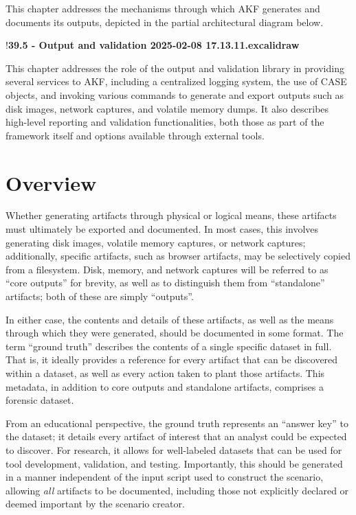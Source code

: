 This chapter addresses the mechanisms through which AKF generates and
documents its outputs, depicted in the partial architectural diagram
below.

!\textbf{39.5 - Output and validation 2025-02-08 17.13.11.excalidraw}

This chapter addresses the role of the output and validation library in
providing several services to AKF, including a centralized logging
system, the use of CASE objects, and invoking various commands to
generate and export outputs such as disk images, network captures, and
volatile memory dumps. It also describes high-level reporting and
validation functionalities, both those as part of the framework itself
and options available through external tools.

\section{Overview}\label{overview}

Whether generating artifacts through physical or logical means, these
artifacts must ultimately be exported and documented. In most cases,
this involves generating disk images, volatile memory captures, or
network captures; additionally, specific artifacts, such as browser
artifacts, may be selectively copied from a filesystem. Disk, memory,
and network captures will be referred to as ``core outputs'' for
brevity, as well as to distinguish them from ``standalone'' artifacts;
both of these are simply ``outputs''.

In either case, the contents and details of these artifacts, as well as
the means through which they were generated, should be documented in
some format. The term ``ground truth'' describes the contents of a
single specific dataset in full. That is, it ideally provides a
reference for every artifact that can be discovered within a dataset, as
well as every action taken to plant those artifacts. This metadata, in
addition to core outputs and standalone artifacts, comprises a forensic
dataset.

From an educational perspective, the ground truth represents an ``answer
key'' to the dataset; it details every artifact of interest that an
analyst could be expected to discover. For research, it allows for
well-labeled datasets that can be used for tool development, validation,
and testing. Importantly, this should be generated in a manner
independent of the input script used to construct the scenario, allowing
\emph{all} artifacts to be documented, including those not explicitly
declared or deemed important by the scenario creator.

